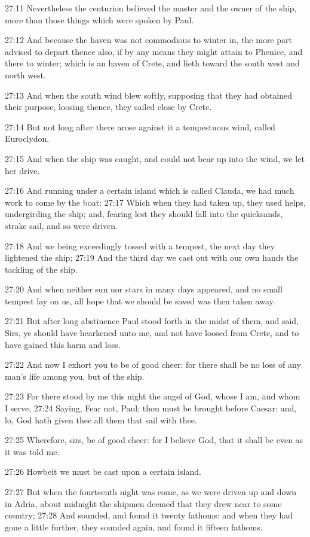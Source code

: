 27:11 Nevertheless the centurion believed the master and the owner of the ship, more than those things which were spoken by Paul.

27:12 And because the haven was not commodious to winter in, the more part advised to depart thence also, if by any means they might attain to Phenice, and there to winter; which is an haven of Crete, and lieth toward the south west and north west.

27:13 And when the south wind blew softly, supposing that they had obtained their purpose, loosing thence, they sailed close by Crete.

27:14 But not long after there arose against it a tempestuous wind, called Euroclydon.

27:15 And when the ship was caught, and could not bear up into the wind, we let her drive.

27:16 And running under a certain island which is called Clauda, we had much work to come by the boat: 27:17 Which when they had taken up, they used helps, undergirding the ship; and, fearing lest they should fall into the quicksands, strake sail, and so were driven.

27:18 And we being exceedingly tossed with a tempest, the next day they lightened the ship; 27:19 And the third day we cast out with our own hands the tackling of the ship.

27:20 And when neither sun nor stars in many days appeared, and no small tempest lay on us, all hope that we should be saved was then taken away.

27:21 But after long abstinence Paul stood forth in the midst of them, and said, Sirs, ye should have hearkened unto me, and not have loosed from Crete, and to have gained this harm and loss.

27:22 And now I exhort you to be of good cheer: for there shall be no loss of any man's life among you, but of the ship.

27:23 For there stood by me this night the angel of God, whose I am, and whom I serve, 27:24 Saying, Fear not, Paul; thou must be brought before Caesar: and, lo, God hath given thee all them that sail with thee.

27:25 Wherefore, sirs, be of good cheer: for I believe God, that it shall be even as it was told me.

27:26 Howbeit we must be cast upon a certain island.

27:27 But when the fourteenth night was come, as we were driven up and down in Adria, about midnight the shipmen deemed that they drew near to some country; 27:28 And sounded, and found it twenty fathoms: and when they had gone a little further, they sounded again, and found it fifteen fathoms.

